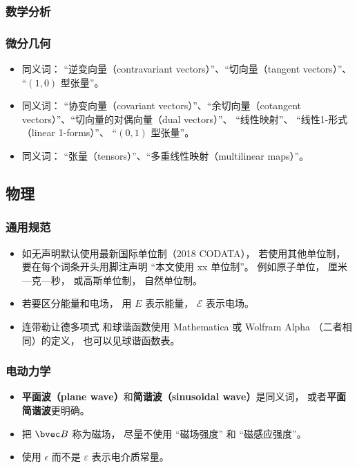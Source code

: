 \subsubsection{数学分析}

\subsubsection{微分几何}
\begin{itemize}
\item 同义词： “逆变向量（contravariant vectors）”、“切向量（tangent vectors）”、 “$(1, 0)$ 型张量”。
\item 同义词： “协变向量（covariant vectors）”、“余切向量（cotangent vectors）”、“切向量的对偶向量（dual vectors）”、 “线性映射”、 “线性1-形式（linear 1-forms）”、 “$(0, 1)$ 型张量”。
\item 同义词： “张量（tensors）”、“多重线性映射（multilinear maps）”。
\end{itemize}

\subsection{物理}
\subsubsection{通用规范}
\begin{itemize}
\item 如无声明默认使用最新国际单位制（2018 CODATA）， 若使用其他单位制， 要在每个词条开头用脚注声明 “本文使用 xx 单位制”。 例如原子单位， 厘米—克—秒， 或高斯单位制， 自然单位制。
\item 若要区分能量和电场， 用 $E$ 表示能量， $\mathcal E$ 表示电场。
\item 连带勒让德多项式 和球谐函数使用 Mathematica 或 Wolfram Alpha （二者相同）的定义， 也可以见球谐函数表。
\end{itemize}

\subsubsection{电动力学}
\begin{itemize}
\item \textbf{平面波（plane wave）}和\textbf{简谐波（sinusoidal wave）}是同义词， 或者\textbf{平面简谐波}更明确。
\item 把 $\bvec B$ 称为磁场， 尽量不使用 “磁场强度” 和 “磁感应强度”。
\item 使用 $\epsilon$ 而不是 $\varepsilon$ 表示电介质常量。
\end{itemize}

